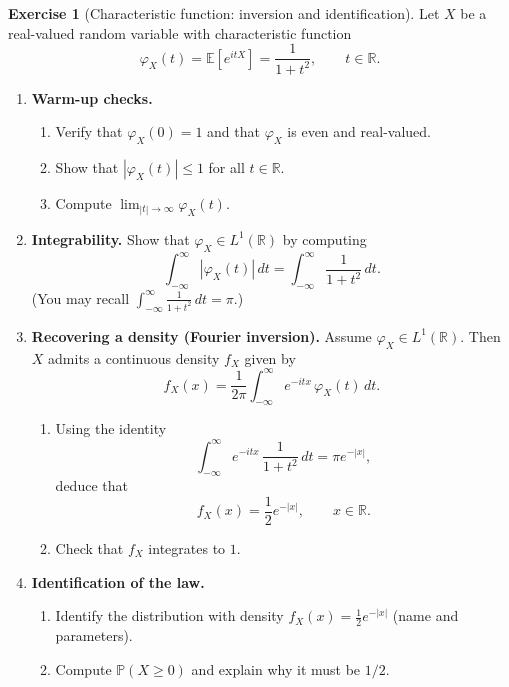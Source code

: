 \documentclass[11pt]{article}
\newcommand{\1}{\mathbf{1}}
\theoremstyle{definition}
\newtheorem{exercise}{Exercise}[section]
\begin{document}
\begin{exercise}[Characteristic function: inversion and identification]
Let $X$ be a real-valued random variable with characteristic function
$$
\varphi_X(t)=\mathbb E\!\left[e^{itX}\right]=\frac{1}{1+t^2},\qquad t\in\mathbb R.
$$
\begin{enumerate}[label=\textbf{(\alph*)}, itemsep=0.35em]

  \item \textbf{Warm-up checks.}
  \begin{enumerate}[label=\textbf{(\roman*)}, itemsep=0.2em]
    \item Verify that $\varphi_X(0)=1$ and that $\varphi_X$ is even and real-valued.
    \item Show that $|\varphi_X(t)|\le 1$ for all $t\in\mathbb R$.
    \item Compute $\displaystyle \lim_{|t|\to\infty}\varphi_X(t)$.
  \end{enumerate}

  \item \textbf{Integrability.}
  Show that $\varphi_X\in L^1(\mathbb R)$ by computing
  $$
  \int_{-\infty}^{\infty}\left|\varphi_X(t)\right|\,dt
  =
  \int_{-\infty}^{\infty}\frac{1}{1+t^2}\,dt.
  $$
  (You may recall $\int_{-\infty}^{\infty}\frac{1}{1+t^2}\,dt=\pi$.)

  \item \textbf{Recovering a density (Fourier inversion).}
  Assume $\varphi_X\in L^1(\mathbb R)$. Then $X$ admits a continuous density $f_X$ given by
  $$
  f_X(x)=\frac{1}{2\pi}\int_{-\infty}^{\infty} e^{-itx}\,\varphi_X(t)\,dt.
  $$
  \begin{enumerate}[label=\textbf{(\roman*)}, itemsep=0.2em]
    \item Using the identity
    $$
    \int_{-\infty}^{\infty} e^{-itx}\,\frac{1}{1+t^2}\,dt
    = \pi e^{-|x|},
    $$
    deduce that
    $$
    f_X(x)=\frac12 e^{-|x|},\qquad x\in\mathbb R.
    $$
    \item Check that $f_X$ integrates to $1$.
  \end{enumerate}

  \item \textbf{Identification of the law.}
  \begin{enumerate}[label=\textbf{(\roman*)}, itemsep=0.2em]
    \item Identify the distribution with density $f_X(x)=\frac12 e^{-|x|}$ (name and parameters).
    \item Compute $\mathbb P(X\ge 0)$ and explain why it must be $1/2$.
  \end{enumerate}


\end{enumerate}
\end{exercise}
\end{document}
